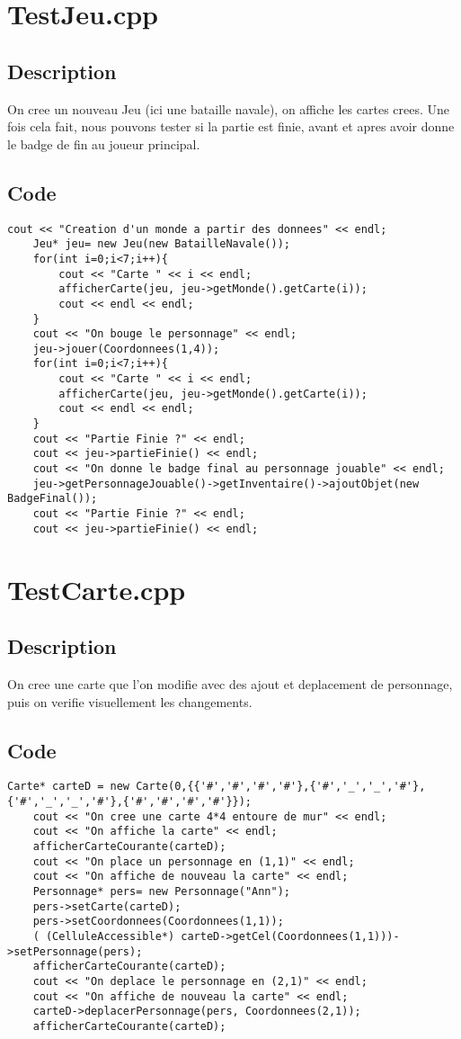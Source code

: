 \section{TestJeu.cpp}
        \subsection{Description}
            On cree un nouveau Jeu (ici une bataille navale), on affiche les cartes crees. Une fois cela fait, nous pouvons tester si la partie est finie, avant et apres avoir donne le badge de fin au joueur principal.
        \subsection{Code}
\begin{lstlisting}
cout << "Creation d'un monde a partir des donnees" << endl;
	Jeu* jeu= new Jeu(new BatailleNavale());
	for(int i=0;i<7;i++){
		cout << "Carte " << i << endl;
		afficherCarte(jeu, jeu->getMonde().getCarte(i));
		cout << endl << endl;
	}
	cout << "On bouge le personnage" << endl;
	jeu->jouer(Coordonnees(1,4));
	for(int i=0;i<7;i++){
		cout << "Carte " << i << endl;
		afficherCarte(jeu, jeu->getMonde().getCarte(i));
		cout << endl << endl;
	}
	cout << "Partie Finie ?" << endl;
	cout << jeu->partieFinie() << endl;
	cout << "On donne le badge final au personnage jouable" << endl;
	jeu->getPersonnageJouable()->getInventaire()->ajoutObjet(new BadgeFinal());
	cout << "Partie Finie ?" << endl;
	cout << jeu->partieFinie() << endl;
	\end{lstlisting}
\section{TestCarte.cpp}
        \subsection{Description}
            On cree une carte que l'on modifie avec des ajout et deplacement de personnage, puis on verifie visuellement les changements.
        \subsection{Code}
\begin{lstlisting}
Carte* carteD = new Carte(0,{{'#','#','#','#'},{'#','_','_','#'},{'#','_','_','#'},{'#','#','#','#'}});
	cout << "On cree une carte 4*4 entoure de mur" << endl;
	cout << "On affiche la carte" << endl;
	afficherCarteCourante(carteD);
	cout << "On place un personnage en (1,1)" << endl;
	cout << "On affiche de nouveau la carte" << endl;
	Personnage* pers= new Personnage("Ann");
	pers->setCarte(carteD);
	pers->setCoordonnees(Coordonnees(1,1));
	( (CelluleAccessible*) carteD->getCel(Coordonnees(1,1)))->setPersonnage(pers);
	afficherCarteCourante(carteD);
	cout << "On deplace le personnage en (2,1)" << endl;
	cout << "On affiche de nouveau la carte" << endl;
	carteD->deplacerPersonnage(pers, Coordonnees(2,1));
	afficherCarteCourante(carteD);
	\end{lstlisting}
